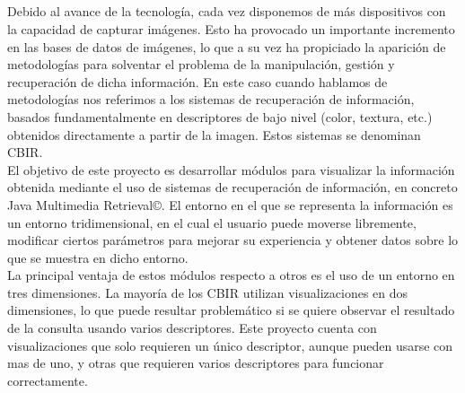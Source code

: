 

%

\begin{center}
{\large\bfseries \myTitle}\\
\end{center}
\begin{center}
\myName\\
\end{center}

\\

\vspace{0.7cm}
\\

Debido al avance de la tecnología, cada vez disponemos de más dispositivos con la capacidad de capturar imágenes. Esto ha provocado un importante incremento en las bases de datos de imágenes, lo que a su vez ha propiciado la aparición de metodologías para solventar el problema de la manipulación, gestión y recuperación de dicha información. En este caso cuando hablamos de metodologías nos referimos a los sistemas de recuperación de información, basados fundamentalmente en descriptores de bajo nivel (color, textura, etc.) obtenidos directamente a partir de la imagen. Estos sistemas se denominan CBIR.\\

El objetivo de este proyecto es desarrollar módulos para visualizar la información obtenida mediante el uso de sistemas de recuperación de información, en concreto Java Multimedia Retrieval©. El entorno en el que se representa la información es un entorno tridimensional, en el cual el usuario puede moverse libremente, modificar ciertos parámetros para mejorar su experiencia y obtener datos sobre lo que se muestra en dicho entorno.\\

La principal ventaja de estos módulos respecto a otros es el uso de un entorno en tres dimensiones. La mayoría de los CBIR utilizan visualizaciones en dos dimensiones, lo que puede resultar problemático si se quiere observar el resultado de la consulta usando varios descriptores. Este proyecto cuenta con visualizaciones que solo requieren un único descriptor, aunque pueden usarse con mas de uno, y otras que requieren varios descriptores para funcionar correctamente.\\

